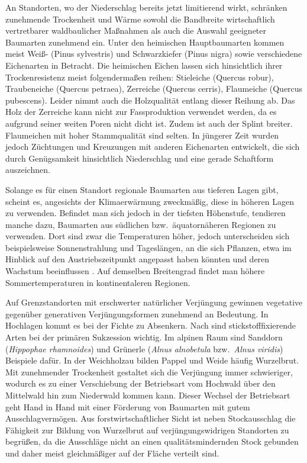 \documentclass[twocolumn]{scrartcl}
\begin{document}
An Standorten, wo der Niederschlag bereits jetzt limitierend wirkt,
schränken zunehmende
Trockenheit und Wärme sowohl die Bandbreite wirtschaftlich
vertretbarer waldbaulicher Maßnahmen als auch die Auswahl geeigneter
Baumarten zunehmend ein. Unter den heimischen Hauptbaumarten kommen
meist Weiß- (Pinus sylvestris) und Schwarzkiefer (Pinus
nigra) sowie verschiedene Eichenarten in Betracht.
Die heimischen Eichen lassen sich hinsichtlich ihrer Trockenresistenz
meist folgendermaßen reihen:
Stieleiche (Quercus robur), Traubeneiche (Quercus petraea),
Zerreiche (Quercus cerris), Flaumeiche (Quercus pubescens). Leider
nimmt auch die Holzqualität entlang dieser Reihung ab. Das Holz der
Zerreiche kann nicht zur Fassproduktion verwendet werden, da es
aufgrund seiner weiten Poren nicht dicht ist. Zudem ist auch der
Splint breiter.
Flaumeichen mit hoher Stammqualität sind selten. In jüngerer Zeit
wurden jedoch Züchtungen und Kreuzungen mit anderen Eichenarten
entwickelt, die sich durch Genügsamkeit hinsichtlich Niederschlag und eine
gerade Schaftform auszeichnen.

Solange es für einen Standort regionale Baumarten aus tieferen Lagen gibt,
scheint es, angesichts der Klimaerwärmung zweckmäßig, diese in höheren Lagen zu
verwenden. Befindet man sich jedoch in der tiefsten Höhenstufe, tendieren manche
dazu, Baumarten aus südlichen bzw.\ äquatornäheren Regionen zu verwenden.
Dort sind zwar die Temperaturen höher, jedoch unterscheiden sich beispielsweise Sonnenstrahlung und Tageslängen, an die sich Pflanzen, etwa im Hinblick auf den Austriebszeitpunkt angepasst haben könnten \citep{phillips1941tageslaenge} und deren Wachstum beeinflussen \citep{jester1939zuwachsUndTageslaenge}.
Auf demselben Breitengrad findet man höhere
Sommertemperaturen in kontinentaleren Regionen.

Auf Grenzstandorten mit erschwerter natürlicher Verjüngung gewinnen vegetative
gegenüber generativen Verjüngungsformen zunehmend an Bedeutung.
In Hochlagen kommt es bei der Fichte zu Absenkern.
Nach \citet{boring1984robinie} sind stickstofffixierende Arten bei der
primären Sukzession wichtig. Im alpinen Raum sind Sanddorn
(\emph{Hippophae rhamnoides}) und Grünerle (\emph{Alnus alnobetula}
bzw.\ \emph{Alnus viridis}) Beispiele dafür.
In der Weichholzau bilden Pappel und Weide häufig Wurzelbrut.
Mit zunehmender Trockenheit gestaltet sich die Verjüngung immer
schwieriger, wodurch es zu einer Verschiebung der Betriebsart vom
Hochwald über den Mittelwald hin zum Niederwald kommen kann.
Dieser Wechsel der Betriebsart geht Hand in Hand mit einer Förderung
von Baumarten mit gutem Ausschlagvermögen.
Aus forstwirtschaftlicher Sicht ist
neben Stockausschlag die Fähigkeit zur Bildung von Wurzelbrut auf
verjüngungswidrigen Standorten zu begrüßen, da die Ausschläge nicht an einen
qualitätsmindernden Stock gebunden und daher meist gleichmäßiger auf der Fläche
verteilt sind.
\end{document}
